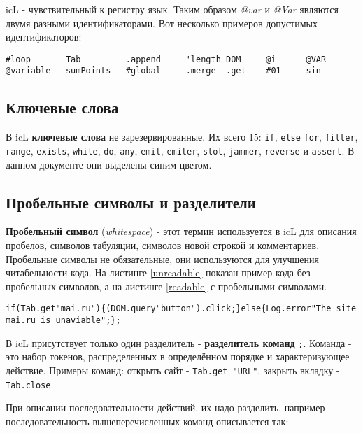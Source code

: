 icL - чувствительный к регистру язык. Таким образом \textit{@var} и \textit{@Var} являются двумя разными идентификаторами. Вот несколько примеров допустимых идентификаторов:

\begin{lstlisting}[numbers=none]
#loop		Tab		    .append		'length	DOM	    @i	 	@VAR
@variable	sumPoints	#global		.merge	.get	#01		sin
\end{lstlisting}

\subsection{Ключевые слова}

В icL \textbf{ключевые слова} не зарезервированные. Их всего 15: \lstinline`if`, \lstinline|else| \lstinline`for`, \lstinline`filter`, \lstinline`range`, \lstinline`exists`, \lstinline`while`, \lstinline`do`, \lstinline`any`, \lstinline`emit`, \lstinline`emiter`, \lstinline`slot`, \lstinline|jammer|, \lstinline|reverse| и \lstinline|assert|. В данном документе они выделены синим цветом.

\subsection{Пробельные символы и разделители}

\textbf{Пробельный символ} (\textit{whitespace}) - этот термин используется в icL для описания пробелов, символов табуляции, символов новой строкой и комментариев. Пробельные символы не обязательные, они используются для улучшения читабельности кода. На листинге \ref{unreadable} показан пример кода без пробельных символов, а на листинге \ref{readable} с пробельными символами.

\begin{lstlisting}[caption=Koд без пробельных символов,label=unreadable]
if(Tab.get"mai.ru"){(DOM.query"button").click;}else{Log.error"The site mai.ru is unaviable";};
\end{lstlisting}

В icL присутствует только один разделитель - \textbf{разделитель команд} \lstinline`;`. Команда - это набор токенов, распределенных в определённом порядке и характеризующее действие. Примеры команд: открыть сайт - \lstinline`Tab.get "URL"`, закрыть вкладку - \lstinline`Tab.close`.

При описании последовательности действий, их надо разделить, например последовательность вышеперечисленных команд описывается так:

